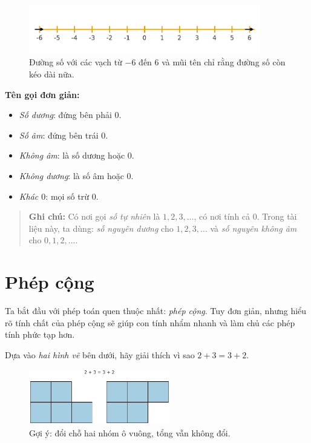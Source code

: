 \begin{figure}[ht!]
  \centering
  \includegraphics[width=0.9\textwidth]{img/fig-numberline.pdf}
  \caption*{\small Đường số với các vạch từ $-6$ đến $6$ và mũi tên chỉ rằng
  đường số còn kéo dài nữa.}
\end{figure}

\noindent\textbf{Tên gọi đơn giản:}
\begin{itemize}
  \item \textit{Số dương}: đứng bên phải $0$.
  \item \textit{Số âm}: đứng bên trái $0$.
  \item \textit{Không âm}: là số dương hoặc $0$.
  \item \textit{Không dương}: là số âm hoặc $0$.
  \item \textit{Khác $0$}: mọi số trừ $0$.
\end{itemize}

\begin{quote}
\textbf{Ghi chú:} Có nơi gọi \emph{số tự nhiên} là $1,2,3,\ldots$,
có nơi tính cả $0$. Trong tài liệu này, ta dùng: \emph{số nguyên dương}
cho $1,2,3,\ldots$ và \emph{số nguyên không âm} cho $0,1,2,\ldots$.
\end{quote}


\section{Phép cộng}

Ta bắt đầu với phép toán quen thuộc nhất: \emph{phép cộng}.
Tuy đơn giản, nhưng hiểu rõ tính chất của phép cộng sẽ giúp con
tính nhẩm nhanh và làm chủ các phép tính phức tạp hơn.

\begin{problem}[1.1]
Dựa vào \emph{hai hình vẽ} bên dưới, hãy giải thích vì sao
$2+3=3+2$.

\begin{figure}[ht!]
  \centering
  \includegraphics[width=0.55\textwidth]{img/fig-prob1.1.pdf}
  \caption*{\small Gợi ý: đổi chỗ hai nhóm ô vuông, tổng vẫn không đổi.}
\end{figure}
\end{problem}

